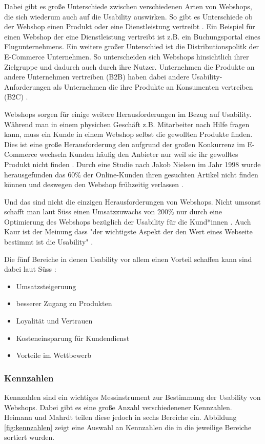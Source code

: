 \documentclass[utf8,biblatex]{lni}
\begin{document}
Dabei gibt es große Unterschiede zwischen verschiedenen Arten von Webshops, die sich wiederum auch auf die Usability auswirken. So gibt es Unterschiede ob der Webshop einen Produkt oder eine Dienstleistung vertreibt \cite{Chariton2002}. Ein Beispiel für einen Webshop der eine Dienstleistung vertreibt ist z.B. ein Buchungsportal eines Flugunternehmens. Ein weitere großer Unterschied ist die Distributionspolitk der E-Commerce Unternehmen. So unterscheiden sich Webshops hinsichtlich ihrer Zielgruppe und dadurch auch durch ihre Nutzer. Unternehmen die Produkte an andere Unternehmen vertreiben (B2B) haben dabei andere Usability-Anforderungen als Unternehmen die ihre Produkte an Konsumenten vertreiben (B2C) \cite{Tharindu2021}.

Webshops sorgen für einige weitere Herausforderungen im Bezug auf Usability. Während man in einem physichen Geschäft z.B. Mitarbeiter nach Hilfe fragen kann, muss ein Kunde in einem Webshop selbst die gewollten Produkte finden. Dies ist eine große Herausforderung den aufgrund der großen Konkurrenz im E-Commerce wechseln Kunden häufig den Anbieter nur weil sie ihr gewolltes Produkt nicht finden \cite{Suess2016}. Durch eine Studie nach Jakob Nielsen im Jahr 1998 wurde herausgefunden das 60\% der Online-Kunden ihren gesuchten Artikel nicht finden können und deswegen den Webshop frühzeitig verlassen \cite{Suess2016}.

Und das sind nicht die einzigen Herausforderungen von Webshops. Nicht umsonst schafft man laut Süss einen Umsatzzuwachs von 200\% nur durch eine Optimierung des Webshops bezüglich der Usability für die Kund*innen \cite{Suess2016}. Auch Kaur ist der Meinung dass "der wichtigste Aspekt der den Wert eines Webseite bestimmt ist die Usability" \cite{Kaur2018}. 

Die fünf Bereiche in denen Usability vor allem einen Vorteil schaffen kann sind dabei laut Süss \cite{Suess2016}:
\begin{itemize}
  \item Umsatzsteigeruung
  \item besserer Zugang zu Produkten
  \item Loyalität und Vertrauen
  \item Kosteneinsparung für Kundendienst
  \item Vorteile im Wettbewerb 
\end{itemize}


\subsubsection*{Kennzahlen}
Kennzahlen sind ein wichtiges Messinstrument zur Bestimmung der Usability von Webshops. Dabei gibt es eine große Anzahl verschiedenener Kennzahlen. Heimann und Mahrdt teilen diese jedoch in sechs Bereiche ein. Abbildung \ref{fig:kennzahlen} zeigt eine Auswahl an Kennzahlen die in die jeweilige Bereiche sortiert wurden. 
\end{document}
